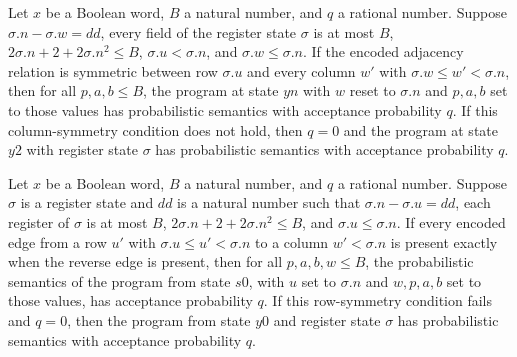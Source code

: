\begin{lemma}
\label{Complexity.LogProg.ups_ycol}
\leanok
{}
Let $x$ be a Boolean word, $B$ a natural number, and $q$ a rational number. Suppose
$\sigma.n-\sigma.w=dd$, every field of the register state $\sigma$ is at most $B$,
$2\sigma.n+2+2\sigma.n^2\le B$, $\sigma.u<\sigma.n$, and $\sigma.w\le\sigma.n$. If the
encoded adjacency relation is symmetric between row $\sigma.u$ and every column $w'$
with $\sigma.w\le w'<\sigma.n$, then for all $p,a,b\le B$, the program at state $yn$
with $w$ reset to $\sigma.n$ and $p,a,b$ set to those values has probabilistic semantics
with acceptance probability $q$. If this column-symmetry condition does not hold, then
$q=0$ and the program at state $y2$ with register state $\sigma$ has probabilistic
semantics with acceptance probability $q$.
\end{lemma}

\begin{lemma}
\label{Complexity.LogProg.ups_yrow}
\leanok
{}
Let $x$ be a Boolean word, $B$ a natural number, and $q$ a rational number. Suppose
$\sigma$ is a register state and $dd$ is a natural number such that
$\sigma.n-\sigma.u=dd$, each register of $\sigma$ is at most $B$,
$2\sigma.n+2+2\sigma.n^2\le B$, and $\sigma.u\le\sigma.n$. If every encoded edge from a
row $u'$ with $\sigma.u\le u'<\sigma.n$ to a column $w'<\sigma.n$ is present exactly
when the reverse edge is present, then for all $p,a,b,w\le B$, the probabilistic
semantics of the program from state $s0$, with $u$ set to $\sigma.n$ and $w,p,a,b$ set
to those values, has acceptance probability $q$. If this row-symmetry condition fails
and $q=0$, then the program from state $y0$ and register state $\sigma$ has
probabilistic semantics with acceptance probability $q$.
\end{lemma}
